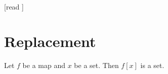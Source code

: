 \documentclass[10pt]{article}
\begin{document}
  \begin{imports}
    \begin{forthel}
      [read ]
    \end{forthel}
  \end{imports}


  \section{Replacement}

  \begin{forthel}
    \begin{axiom}[title=Replacement Axiom,id=FOUNDATIONS_10_8142956584239104,printid]
      Let $f$ be a map and $x$ be a set.
      Then $f[x]$ is a set.
    \end{axiom}
  \end{forthel}
\end{document}
